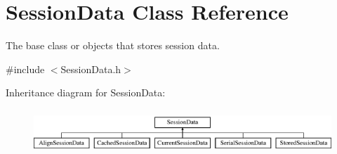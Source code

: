 \hypertarget{class_session_data}{\section{Session\-Data Class Reference}
\label{class_session_data}
}


The base class or objects that stores session data.  




{\ttfamily \#include $<$Session\-Data.\-h$>$}

Inheritance diagram for Session\-Data\-:\begin{figure}[H]
\begin{center}
\leavevmode
\includegraphics[height=1.671642cm]{class_session_data}
\end{center}
\end{figure}
